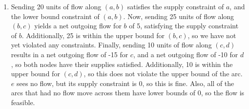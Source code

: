 \documentclass[12pt]{article}
\begin{document}
\begin{enumerate}
\begin{enumerate}
\begin{itemize}
\begin{tabular}{|r|c|c|}
            \end{tabular}
        \end{itemize}
      \item
        Sending 20 units of flow along $(a,b)$ satisfies the supply constraint
        of $a$, and the lower bound constraint of $(a, b)$. Now, sending 25
        units of flow along $(b,c)$ yields a net outgoing flow for $b$ of 5,
        satisfying the supply constraint of $b$. Additionally, 25 is within the
        upper bound for $(b,c)$, so we have not yet violated any constraints.
        Finally, sending 10 units of flow along $(c,d)$ results in a net
        outgoing flow of -15 for $c$, and a net outgoing flow of -10 for $d$,
        so both nodes have their supplies satisfied. Additionally, 10 is within
        the upper bound for $(c,d)$, so this does not violate the upper bound
        of the arc. $e$ sees no flow, but its supply constraint is 0, so this
        is fine. Also, all of the arcs that had no flow move across them have
        lower bounds of 0, so the flow is feasible.\\


\end{enumerate}
\end{enumerate}
\end{document}
